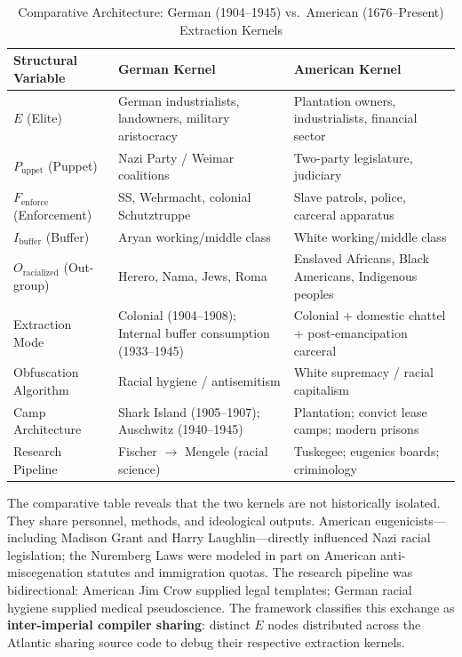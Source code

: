 \begin{table}[htbp]
\centering
\small
\caption{Comparative Architecture: German (1904--1945) vs.\ American (1676--Present) Extraction Kernels}
\label{tab:german_american_compare}
\begin{tabular}{>{\raggedright}p{3.5cm} >{\raggedright}p{5.5cm} >{\raggedright\arraybackslash}p{5.5cm}}
\toprule
\textbf{Structural Variable} & \textbf{German Kernel} & \textbf{American Kernel} \\
\midrule
$E$ (Elite) & German industrialists, landowners, military aristocracy & Plantation owners, industrialists, financial sector \\
$P_{\text{uppet}}$ (Puppet) & Nazi Party / Weimar coalitions & Two-party legislature, judiciary \\
$F_{\text{enforce}}$ (Enforcement) & SS, Wehrmacht, colonial Schutztruppe & Slave patrols, police, carceral apparatus \\
$I_{\text{buffer}}$ (Buffer) & Aryan working/middle class & White working/middle class \\
$O_{\text{racialized}}$ (Out-group) & Herero, Nama, Jews, Roma & Enslaved Africans, Black Americans, Indigenous peoples \\
\midrule
Extraction Mode & Colonial (1904--1908); Internal buffer consumption (1933--1945) & Colonial + domestic chattel + post-emancipation carceral \\
Obfuscation Algorithm & Racial hygiene / antisemitism & White supremacy / racial capitalism \\
Camp Architecture & Shark Island (1905--1907); Auschwitz (1940--1945) & Plantation; convict lease camps; modern prisons \\
Research Pipeline & Fischer $\rightarrow$ Mengele (racial science) & Tuskegee; eugenics boards; criminology \\
\bottomrule
\end{tabular}
\end{table}

The comparative table reveals that the two kernels are not historically isolated. They share personnel, methods, and ideological outputs. American eugenicists---including Madison Grant and Harry Laughlin---directly influenced Nazi racial legislation; the Nuremberg Laws were modeled in part on American anti-miscegenation statutes and immigration quotas. The research pipeline was bidirectional: American Jim Crow supplied legal templates; German racial hygiene supplied medical pseudoscience. The framework classifies this exchange as \textbf{inter-imperial compiler sharing}: distinct $E$ nodes distributed across the Atlantic sharing source code to debug their respective extraction kernels.

